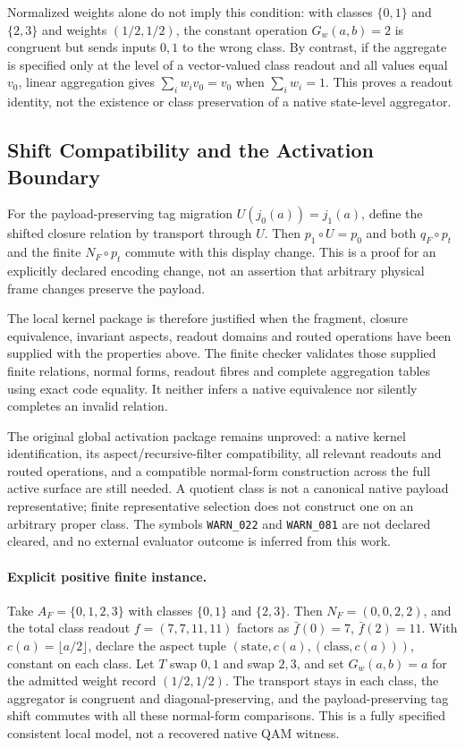 Normalized weights alone do not imply this condition: with classes
$\{0,1\}$ and $\{2,3\}$ and weights $(1/2,1/2)$, the constant
operation $G_w(a,b)=2$ is congruent but sends inputs $0,1$ to the
wrong class. By contrast, if the aggregate is specified only at
the level of a vector-valued class readout and all values equal
$v_0$, linear aggregation gives
$\sum_i w_i v_0=v_0$ when $\sum_i w_i=1$. This proves a readout
identity, not the existence or class preservation of a native
state-level aggregator.

\subsection{Shift Compatibility and the Activation Boundary}
\label{v480:kernel-activation-boundary}

For the payload-preserving tag migration
$U(j_0(a))=j_1(a)$, define the shifted closure relation by
transport through $U$. Then $p_1\circ U=p_0$ and both $q_F\circ p_t$
and the finite $N_F\circ p_t$ commute with this display change.
This is a proof for an explicitly declared encoding change, not
an assertion that arbitrary physical frame changes preserve the payload.

The local kernel package is therefore justified when the fragment,
closure equivalence, invariant aspects, readout domains and routed
operations have been supplied with the properties above. The finite
checker validates those supplied finite relations, normal forms,
readout fibres and complete aggregation tables using exact code
equality. It neither infers a native equivalence nor silently
completes an invalid relation.

The original global activation package remains unproved: a native
kernel identification, its aspect/recursive-filter compatibility,
all relevant readouts and routed operations, and a compatible
normal-form construction across the full active surface are still
needed. A quotient class is not a canonical native payload
representative; finite representative selection does not construct
one on an arbitrary proper class. The symbols
\texttt{WARN\_022} and \texttt{WARN\_081} are not declared cleared,
and no external evaluator outcome is inferred from this work.

\paragraph{Explicit positive finite instance.}
Take $A_F=\{0,1,2,3\}$ with classes $\{0,1\}$ and $\{2,3\}$.
Then $N_F=(0,0,2,2)$, and the total class readout
$f=(7,7,11,11)$ factors as $\bar f(0)=7$, $\bar f(2)=11$.
With $c(a)=\lfloor a/2\rfloor$, declare the aspect tuple
$(\mathrm{state},c(a),(\mathrm{class},c(a)))$, constant on each class.
Let $T$ swap $0,1$ and swap $2,3$, and set $G_w(a,b)=a$ for
the admitted weight record $(1/2,1/2)$. The transport stays in
each class, the aggregator is congruent and diagonal-preserving,
and the payload-preserving tag shift commutes with all these
normal-form comparisons. This is a fully specified consistent
local model, not a recovered native QAM witness.
